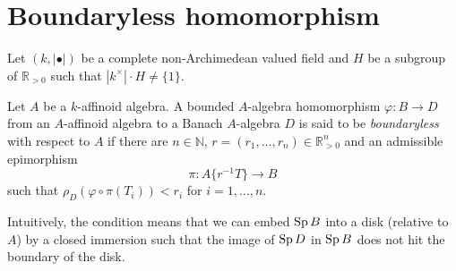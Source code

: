 \section{Boundaryless homomorphism}
Let $(k,|\bullet|)$ be a complete non-Archimedean valued field and $H$ be a subgroup of $\mathbb{R}_{>0}$ such that $|k^{\times}|\cdot H\neq \{1\}$.

\begin{definition}
    Let $A$ be a $k$-affinoid algebra. A bounded $A$-algebra homomorphism $\varphi:B\rightarrow D$ from an $A$-affinoid algebra to a Banach $A$-algebra $D$ is said to be \emph{boundaryless} with respect to $A$ if there are $n\in \mathbb{N}$, $r=(r_1,\ldots,r_n)\in \mathbb{R}^n_{>0}$ and an admissible epimorphism
    \[
        \pi: A\{r^{-1}T\}\rightarrow B    
    \] 
    such that $\rho_D(\varphi\circ \pi(T_i))<r_i$ for $i=1,\ldots,n$.
\end{definition}
Intuitively, the condition means that we can embed $\operatorname{Sp} B$ into a disk (relative to $A$) by a closed immersion such that the image of $\operatorname{Sp} D$ in $\operatorname{Sp} B$ does not hit the boundary of the disk.

